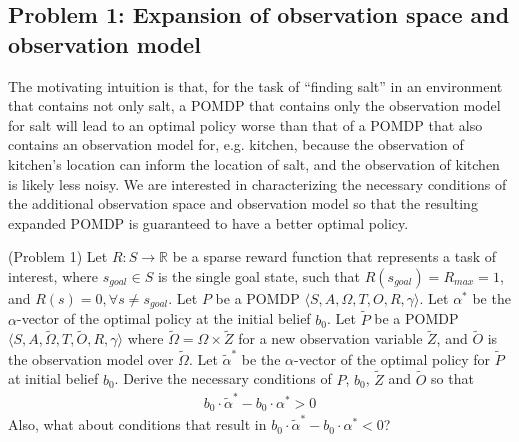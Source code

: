 \documentclass{article}
\newcommand{\td}[1]{\tilde{#1}}
\begin{document}
\subsection{Problem 1: Expansion of observation space and observation model}

The motivating intuition is that, for the task of ``finding salt'' in an environment that contains not only salt, a POMDP that contains only the observation model for salt will lead to an optimal policy worse than that of a POMDP that also contains an observation model for, e.g. kitchen, because the observation of kitchen's location can inform the location of salt, and the observation of kitchen is likely less noisy. We are interested in characterizing the necessary conditions of the additional observation space and observation model so that the resulting expanded POMDP is guaranteed to have a better optimal policy.

\begin{definition}(Problem 1)
Let $R:S\rightarrow \mathbb{R}$ be a sparse reward function that represents a
task of interest, where $s_{goal}\in S$ is the single goal state, such that
$R(s_{goal})=R_{max}=1$, and $R(s)=0, \forall s \neq s_{goal}$.
Let $P$ be a POMDP $\langle S, A, \Omega, T, O, R, \gamma  \rangle$. Let $\alpha^*$ be the $\alpha$-vector of the optimal policy at the initial belief $b_0$. Let $\td{P}$ be a POMDP $\langle S, A, \td{\Omega}, T, \td{O}, R, \gamma  \rangle$ where $\td{\Omega}=\Omega\times\td{Z}$ for a new observation variable $\td{Z}$, and $\td{O}$ is the observation model over $\td{\Omega}$. Let $\td{\alpha}^*$ be the $\alpha$-vector of the optimal policy for $\td{P}$ at initial belief $b_0$. Derive the necessary conditions of $P$, $b_0$, $\td{Z}$ and $\td{O}$ so that
\begin{align}
b_0\cdot \td{\alpha}^* - b_0\cdot \alpha^* > 0
\end{align}
Also, what about conditions that result in $b_0\cdot \td{\alpha}^* - b_0\cdot \alpha^* < 0$?
\end{definition}
\end{document}
